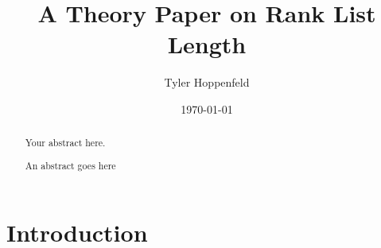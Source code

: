 \documentclass[WP]{AEA}
\begin{document}
\title{A Theory Paper on Rank List Length}
\author{Tyler Hoppenfeld}
\date{\today}
\JEL{}
\Keywords{}

\begin{abstract}
Your abstract here.
\end{abstract}


\maketitle

\begin{abstract}
	An abstract goes here
\end{abstract}

\section{Introduction}
\end{document}
